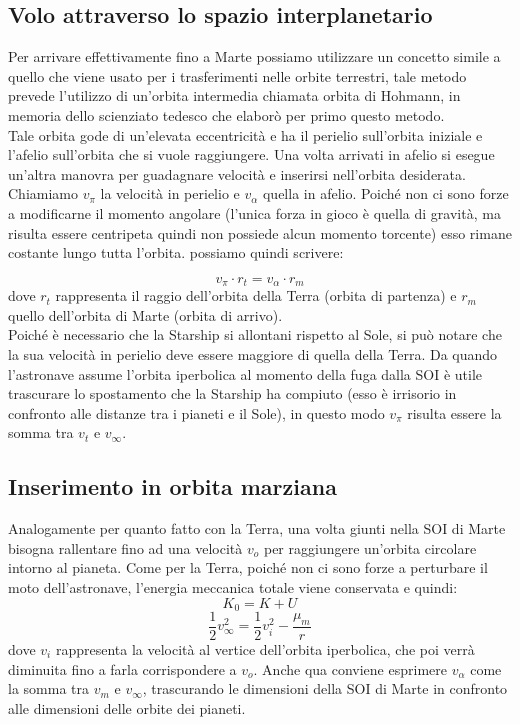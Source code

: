 \subsection{Volo attraverso lo spazio interplanetario}
Per arrivare effettivamente fino a Marte possiamo utilizzare un concetto simile a quello che viene usato per i trasferimenti nelle orbite terrestri, tale metodo prevede l'utilizzo di un'orbita intermedia chiamata orbita di Hohmann, in memoria dello scienziato tedesco che elaborò per primo questo metodo.\\
Tale orbita gode di un'elevata eccentricità e ha il perielio sull'orbita iniziale e l'afelio sull'orbita che si vuole raggiungere. Una volta arrivati in afelio si esegue un'altra manovra per guadagnare velocità e inserirsi nell'orbita desiderata.\\
Chiamiamo $v_\pi$ la velocità in perielio e $v_\alpha$ quella in afelio.
Poiché non ci sono forze a modificarne il momento angolare (l'unica forza in gioco è quella di gravità, ma risulta essere centripeta quindi non possiede alcun momento torcente) esso rimane costante lungo tutta l'orbita.
possiamo quindi scrivere:

\begin{equation}
    \label{Conservazione MA}
    v_\pi \cdot r_t = v_\alpha \cdot r_m
\end{equation}
dove $r_t$ rappresenta il raggio dell'orbita della Terra (orbita di partenza) e $r_m$ quello dell'orbita di Marte (orbita di arrivo).\\
Poiché è necessario che la Starship si allontani rispetto al Sole, si può notare che la sua velocità in perielio deve essere maggiore di quella della Terra. Da quando l'astronave assume l'orbita iperbolica al momento della fuga dalla SOI è utile trascurare lo spostamento che la Starship ha compiuto (esso è irrisorio in confronto alle distanze tra i pianeti e il Sole), in questo modo $v_\pi$ risulta essere la somma tra $v_t$ e $v_\infty$. 

\subsection{Inserimento in orbita marziana}
Analogamente per quanto fatto con la Terra, una volta giunti nella SOI di Marte bisogna rallentare fino ad una velocità $v_o$ per raggiungere un'orbita circolare intorno al pianeta.
Come per la Terra, poiché non ci sono forze a perturbare il moto dell'astronave, l'energia meccanica totale viene conservata e quindi:
$$K_0 = K + U$$
\begin{equation}
    \label{Velocità marte}
    \frac{1}{2}v_\infty^2  = \frac{1}{2}v_i^2 - \frac{\mu_m}{r}
\end{equation}
dove $v_i$ rappresenta la velocità al vertice dell'orbita iperbolica, che poi verrà diminuita fino a farla corrispondere a $v_o$.
Anche qua conviene esprimere $v_\alpha$ come la somma tra $v_m$ e $v_\infty$, trascurando le dimensioni della SOI di Marte in confronto alle dimensioni delle orbite dei pianeti.
